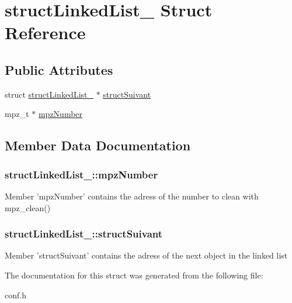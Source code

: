 \hypertarget{structstructLinkedList__}{\section{struct\-Linked\-List\-\_\- Struct Reference}
\label{structstructLinkedList__}
}
\subsection*{Public Attributes}
\begin{DoxyCompactItemize}
\item 
struct \hyperlink{structstructLinkedList__}{struct\-Linked\-List\-\_\-} $\ast$ \hyperlink{structstructLinkedList___a8339f2d5317c45db84ceb9a8a5317aaf}{struct\-Suivant}
\item 
mpz\-\_\-t $\ast$ \hyperlink{structstructLinkedList___a30592780e42afbbc894c2d864fb4229e}{mpz\-Number}
\end{DoxyCompactItemize}


\subsection{Member Data Documentation}
\hypertarget{structstructLinkedList___a30592780e42afbbc894c2d864fb4229e}{
\subsubsection[{mpz\-Number}]{\setlength{\rightskip}{0pt plus 5cm}struct\-Linked\-List\-\_\-\-::mpz\-Number}}\label{structstructLinkedList___a30592780e42afbbc894c2d864fb4229e}
Member 'mpz\-Number' contains the adress of the number to clean with mpz\-\_\-clean() \hypertarget{structstructLinkedList___a8339f2d5317c45db84ceb9a8a5317aaf}{
\subsubsection[{struct\-Suivant}]{\setlength{\rightskip}{0pt plus 5cm}struct\-Linked\-List\-\_\-\-::struct\-Suivant}}\label{structstructLinkedList___a8339f2d5317c45db84ceb9a8a5317aaf}
Member 'struct\-Suivant' contains the adress of the next object in the linked list 

The documentation for this struct was generated from the following file\-:\begin{DoxyCompactItemize}
\item 
conf.\-h\end{DoxyCompactItemize}
